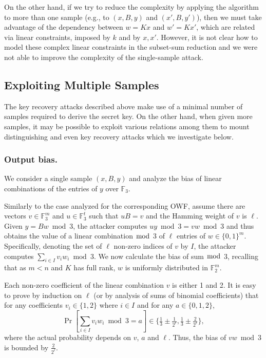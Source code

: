 \documentclass[orivec,envcountsect]{llncs}
\begin{document}
On the other hand, if we try to reduce the complexity by applying the algorithm to more than one sample (e.g., to $(x,B,y)$ and $(x',B,y')$), then we must take advantage of the dependency between $w = K x$ and $w' = K x'$, which are related via linear constraints, imposed by $k$ and by $x,x'$. However, it is not clear how to model these complex linear constraints in the subset-sum reduction and we were not able to improve the complexity of the single-sample attack.

\subsection{Exploiting Multiple Samples}
The key recovery attacks described above make use of a minimal number of samples required to derive the secret key. On the other hand, when given more samples, it may be possible to exploit various relations among them to mount distinguishing and even key recovery attacks which we investigate below.


\subsubsection{Output bias.}
We consider a single sample $(x,B,y)$ and analyze the bias of linear combinations of the entries of $y$ over $\mathbb{F}_3$.

Similarly to the case analyzed for the corresponding OWF, assume there are vectors $v \in \mathbb{F}_3^m$ and $u \in \mathbb{F}_3^t$ such that $u B = v$ and the Hamming weight of $v$ is $\ell$. Given $y = Bw \bmod 3$, the attacker computes $uy \bmod 3 = vw \bmod 3$ and thus obtains the value of a linear combination $\bmod$ 3 of $\ell$ entries of $w \in \{0,1\}^m$.
Specifically, denoting the set of $\ell$ non-zero indices of $v$ by $I$, the attacker computes $\sum_{i \in I} v_i w_i \bmod 3$.
We now calculate the bias of sum $\bmod $ 3, recalling that as $m < n$ and $K$ has full rank, $w$ is uniformly distributed in $\mathbb{F}_2^m$.

Each non-zero coefficient of the linear combination $v$ is either 1 and 2.
It is easy to prove by induction on $\ell$ (or by analysis of sums of binomial coefficients) that
for any coefficients $v_i \in \{1,2\}$ where $i \in I$ and for any $a \in \{0,1,2\}$,
$$\Pr\left[\sum_{i \in I} v_i w_i \bmod 3 = a\right] \in \{\tfrac{1}{3} \pm \tfrac{1}{2^\ell}, \tfrac{1}{3} \pm \tfrac{2}{2^\ell}\},$$
where the actual probability depends on $v$, $a$ and $\ell$. Thus, the bias of $vw \bmod 3$ is bounded by $\tfrac{2}{2^\ell}$.
\end{document}
